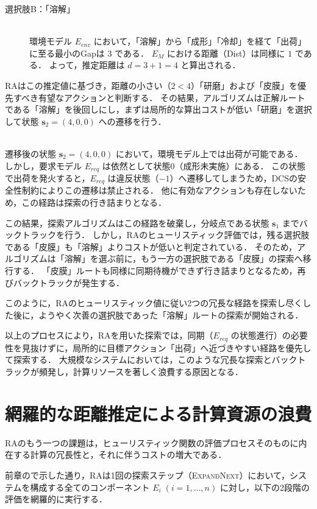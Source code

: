 \documentclass[a4paper,11pt,oneside,openany,report,dvipdfmx]{jsbook}
\newcommand{\descitem}[1]{\item[#1]\mbox{}\\}
\newcommand\aref[1]{\hyperref[#1]{\prettyref{#1}}}
\begin{document}
\begin{description}
\begin{description}
    \descitem{選択肢B：「溶解」}
    環境モデル $E_\mathit{env}$ において，「溶解」から「成形」「冷却」を経て「出荷」に至る最小のGapは $3$ である．
    $E_M$ における距離（Dist）は同様に $1$ である．
    よって，推定距離は $d = 3 + 1 = 4$ と算出される．
  \end{description}

  RAはこの推定値に基づき，距離の小さい（$2 < 4$）「研磨」および「皮膜」を優先すべき有望なアクションと判断する．
  その結果，アルゴリズムは正解ルートである「溶解」を後回しにし，まずは局所的な算出コストが低い「研磨」を選択して状態 $\bm{s}_2 = (4, 0, 0)$ への遷移を行う．

  \descitem{Step 3: 経路の行き詰まりと繰り返される不要な探索}
  遷移後の状態 $\bm{s}_2 = (4, 0, 0)$ において，環境モデル上では出荷が可能である．
  しかし，要求モデル $E_\mathit{req}$ は依然として状態0（成形未実施）にある．
  この状態で出荷を発火すると，$E_\mathit{req}$ は違反状態（$-1$）へ遷移してしまうため，DCSの安全性制約によりこの遷移は禁止される．
  他に有効なアクションも存在しないため，この経路は探索の行き詰まりとなる．

  この結果，探索アルゴリズムはこの経路を破棄し，分岐点である状態 $\bm{s}_1$ までバックトラックを行う．
  しかし，RAのヒューリスティック評価では，残る選択肢である「皮膜」も「溶解」よりコストが低いと判定されている．
  そのため，アルゴリズムは「溶解」を選ぶ前に，もう一方の選択肢である「皮膜」の探索へ移行する．
  「皮膜」ルートも同様に同期待機ができず行き詰まりとなるため，再びバックトラックが発生する．

  このように，RAのヒューリスティック値に従い2つの冗長な経路を探索し尽くした後に，ようやく次善の選択肢であった「溶解」ルートの探索が開始される．
\end{description}

以上のプロセスにより，RAを用いた探索では，同期（$E_\mathit{req}$ の状態進行）の必要性を見抜けずに，局所的に目標アクション「出荷」へ近づきやすい経路を優先して探索する．
大規模なシステムにおいては，このような冗長な探索とバックトラックが頻発し，計算リソースを著しく浪費する原因となる．

\section{網羅的な距離推定による計算資源の浪費}

RAのもう一つの課題は，ヒューリスティック関数の評価プロセスそのものに内在する計算の冗長性と，それに伴うコストの増大である．

前章の\aref{alg:ra_heuristic}で示した通り，RAは1回の探索ステップ（\textsc{ExpandNext}）において，システムを構成する全てのコンポーネント $E_i \; (i=1, \dots, n)$ に対し，以下の2段階の評価を網羅的に実行する．
\end{document}
